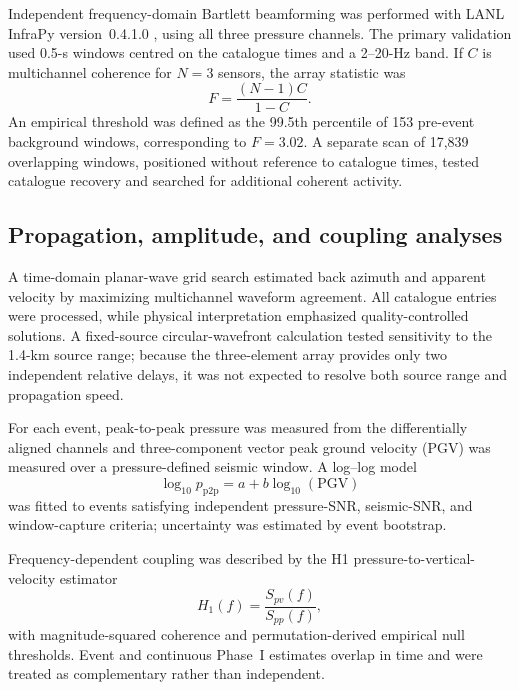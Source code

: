 \documentclass[]{seismica}
\begin{document}
Independent frequency-domain Bartlett beamforming was performed with LANL
InfraPy version~0.4.1.0 \citep{webster_infrapy_2025}, using all three pressure
channels. The primary validation used 0.5-s windows centred on the catalogue
times and a 2--20-Hz band. If $C$ is multichannel coherence for $N=3$
sensors, the array statistic was
\begin{equation}
 F=\frac{(N-1)C}{1-C}.
\end{equation}
An empirical threshold was defined as the 99.5th percentile of 153 pre-event
background windows, corresponding to $F=3.02$. A separate scan of 17,839
overlapping windows, positioned without reference to catalogue times, tested
catalogue recovery and searched for additional coherent activity.

\subsection{Propagation, amplitude, and coupling analyses}

A time-domain planar-wave grid search estimated back azimuth and apparent
velocity by maximizing multichannel waveform agreement. All catalogue entries
were processed, while physical interpretation emphasized quality-controlled
solutions. A fixed-source circular-wavefront calculation tested sensitivity to
the 1.4-km source range; because the three-element array provides only two
independent relative delays, it was not expected to resolve both source range
and propagation speed.

For each event, peak-to-peak pressure was measured from the differentially
aligned channels and three-component vector peak ground velocity (PGV) was
measured over a pressure-defined seismic window. A log--log model
\begin{equation}
 \log_{10}p_{\mathrm{p2p}}=a+b\log_{10}(\mathrm{PGV})
 \label{eq:power_law}
\end{equation}
was fitted to events satisfying independent pressure-SNR, seismic-SNR, and
window-capture criteria; uncertainty was estimated by event bootstrap.

Frequency-dependent coupling was described by the H1 pressure-to-vertical-
velocity estimator
\begin{equation}
 H_1(f)=\frac{S_{pv}(f)}{S_{pp}(f)},
 \label{eq:h1_transfer}
\end{equation}
with magnitude-squared coherence and permutation-derived empirical null
thresholds. Event and continuous Phase~I estimates overlap in time and were
treated as complementary rather than independent.
\end{document}
